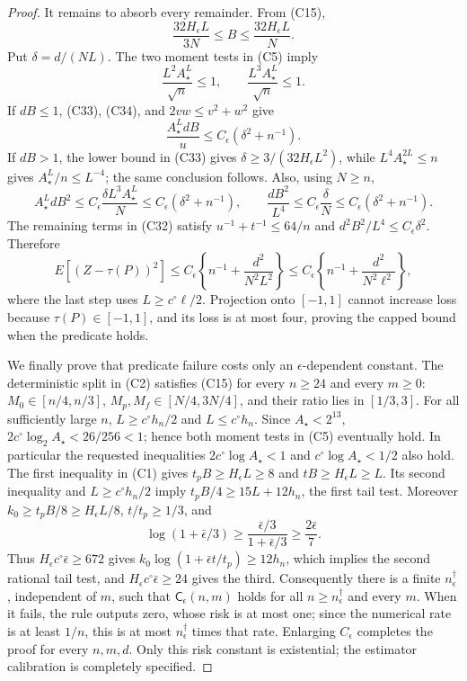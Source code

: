 \documentclass{article}
\begin{document}
\begin{proof}
It remains to absorb every remainder.  From (C15),
\[
 \frac{32H_\epsilon L}{3N}\le B\le\frac{32H_\epsilon L}{N}.       \tag{C33}
\]
Put \(\delta=d/(NL)\).  The two moment tests in (C5) imply
\[
 \frac{L^2A_\star^L}{\sqrt n}\le1,\qquad
 \frac{L^3A_\star^L}{\sqrt n}\le1.                               \tag{C34}
\]
If \(dB\le1\), (C33), (C34), and \(2vw\le v^2+w^2\) give
\[
 \frac{A_\star^LdB}{u}\le C_\epsilon(\delta^2+n^{-1}).
\]
If \(dB>1\), the lower bound in (C33) gives \(\delta\ge3/(32H_\epsilon L^2)\), while \(L^4A_\star^{2L}\le n\) gives \(A_\star^L/n\le L^{-4}\); the same conclusion follows.  Also, using \(N\ge n\),
\[
 A_\star^LdB^2\le C_\epsilon\frac{\delta L^3A_\star^L}{N}
 \le C_\epsilon(\delta^2+n^{-1}),
 \qquad
 \frac{dB^2}{L^4}\le C_\epsilon\frac\delta N
 \le C_\epsilon(\delta^2+n^{-1}).                                 \tag{C35}
\]
The remaining terms in (C32) satisfy \(u^{-1}+t^{-1}\le64/n\) and \(d^2B^2/L^4\le C_\epsilon\delta^2\).  Therefore
\[
 E[(Z-\tau(P))^2]\le C_\epsilon\left\{n^{-1}+\frac{d^2}{N^2L^2}\right\}
 \le C_\epsilon\left\{n^{-1}+\frac{d^2}{N^2\ell^2}\right\},      \tag{C36}
\]
where the last step uses \(L\ge c^\circ\ell/2\).  Projection onto \([-1,1]\) cannot increase loss because \(\tau(P)\in[-1,1]\), and its loss is at most four, proving the capped bound when the predicate holds.

We finally prove that predicate failure costs only an \(\epsilon\)-dependent constant.  The deterministic split in (C2) satisfies (C15) for every \(n\ge24\) and every \(m\ge0\): \(M_0\in[n/4,n/3]\), \(M_p,M_f\in[N/4,3N/4]\), and their ratio lies in \([1/3,3]\).  For all sufficiently large \(n\), \(L\ge c^\circ h_n/2\) and \(L\le c^\circ h_n\).  Since \(A_\star<2^{13}\), \(2c^\circ\log_2 A_\star<26/256<1\); hence both moment tests in (C5) eventually hold.  In particular the requested inequalities \(2c^\circ\log A_\star<1\) and \(c^\circ\log A_\star<1/2\) also hold.  The first inequality in (C1) gives \(t_pB\ge H_\epsilon L\ge8\) and \(tB\ge H_\epsilon L\ge L\).  Its second inequality and \(L\ge c^\circ h_n/2\) imply \(t_pB/4\ge15L+12h_n\), the first tail test.  Moreover \(k_0\ge t_pB/8\ge H_\epsilon L/8\), \(t/t_p\ge1/3\), and
\[
 \log(1+\bar\epsilon/3)\ge\frac{\bar\epsilon/3}{1+\bar\epsilon/3}\ge\frac{2\bar\epsilon}{7}.
\]
Thus \(H_\epsilon c^\circ\bar\epsilon\ge672\) gives \(k_0\log(1+\bar\epsilon t/t_p)\ge12h_n\), which implies the second rational tail test, and \(H_\epsilon c^\circ\bar\epsilon\ge24\) gives the third.  Consequently there is a finite \(n_\epsilon^\dagger\), independent of \(m\), such that \(\mathsf C_\epsilon(n,m)\) holds for all \(n\ge n_\epsilon^\dagger\) and every \(m\).  When it fails, the rule outputs zero, whose risk is at most one; since the numerical rate is at least \(1/n\), this is at most \(n_\epsilon^\dagger\) times that rate.  Enlarging \(C_\epsilon\) completes the proof for every \(n,m,d\).  Only this risk constant is existential; the estimator calibration is completely specified.
\end{proof}
\end{document}
